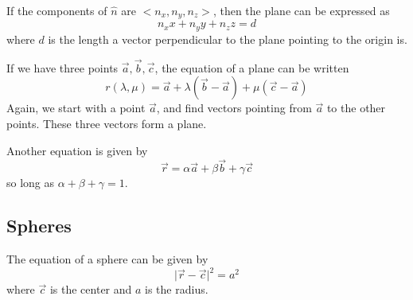 \documentclass{article}
\begin{document}
If the components of $\hat{n}$ are $<n_x, n_y, n_z>$, then the plane can be expressed as$$n_xx + n_yy + n_zz = d$$where $d$ is the length a vector perpendicular to the plane pointing to the origin is. 

If we have three points $\vec{a}, \vec{b}, \vec{c}$, the equation of a plane can be written $$r(\lambda,\mu) = \vec{a} + \lambda(\vec{b} - \vec{a}) + \mu(\vec{c} - \vec{a})$$Again, we start with a point $\vec{a}$, and find vectors pointing from $\vec{a}$ to the other points. These three vectors form a plane. 

Another equation is given by$$\vec{r} = \alpha\vec{a} + \beta\vec{b} + \gamma\vec{c}$$so long as $\alpha + \beta + \gamma = 1$. 

\subsection{Spheres}

The equation of a sphere can be given by$$\vert \vec{r} - \vec{c}\vert^2 = a^2$$where $\vec{c}$ is the center and $a$ is the radius. 
\end{document}
